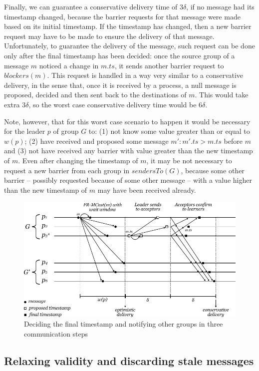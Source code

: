 \documentclass[times, 10pt]{article}
\begin{document}
Finally, we can guarantee a conservative delivery time of $3\delta$, if no message had its timestamp changed, because the barrier requests for that message were made based on its initial timestamp. If the timestamp has changed, then a new barrier request may have to be made to ensure the delivery of that message. Unfortunately, to guarantee the delivery of the message, such request can be done only after the final timestamp has been decided: once the source group of a message $m$ noticed a change in $m.ts$, it sends another barrier request to $blockers(m)$. This request is handled in a way very similar to a conservative delivery, in the sense that, once it is received by a process, a null message is proposed, decided and then sent back to the destinations of $m$. This would take extra $3\delta$, so the worst case conservative delivery time would be $6\delta$.

Note, however, that for this worst case scenario to happen it would be necessary for the leader $p$ of group $G$ to: (1) not know some value greater than or equal to $w(p)$; (2) have received and proposed some message $m' : m'.ts > m.ts$ before $m$ and (3) not have received any barrier with value greater than the new timestamp of $m$. Even after changing the timestamp of $m$, it may be not necessary to request a new barrier from each group in $sendersTo(G)$, because some other barrier -- possibly requested because of some other message -- with a value higher than the new timestamp of $m$ may have been received already.

\begin{figure}
  \centering
  \includegraphics[width=0.8\linewidth]{images/paxos3d}
  \caption{Deciding the final timestamp and notifying other groups in three communication steps}
  \label{fig:paxosmanylearnergroups}
\end{figure}



\subsection{Relaxing validity and discarding stale messages}
\label{sec:discard}
\end{document}
